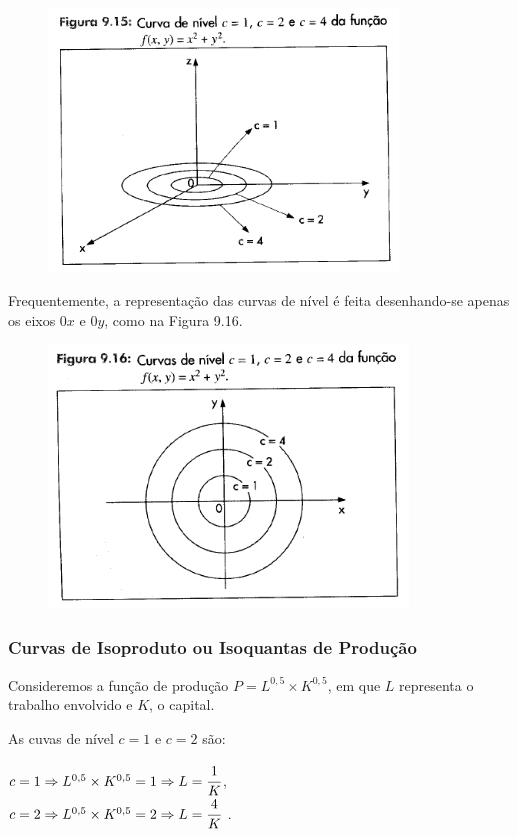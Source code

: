 		\begin{figure}[H]
			\includegraphics[height=7cm]{images/morettin_figura-9-15}
		\end{figure}

		Frequentemente, a representação das curvas de nível é feita desenhando-se apenas os eixos $0x$ e $0y$, como na Figura 9.16.


		\begin{figure}[H]
			\includegraphics[height=7cm]{images/morettin_figura-9-16}
		\end{figure}
		
		\subsubsection{Curvas de Isoproduto ou Isoquantas de Produção \cite{morettin}}

			Consideremos a função de produção $P = L^{0,5} \times K^{0,5}$, em que $L$ representa o trabalho envolvido e $K$, o capital.

			As cuvas de nível $c = 1$ e $c = 2$ são:

			\medskip

			$c = 1 \Rightarrow L^{0,5} \times K^{0,5} = 1 \Rightarrow L = \cfrac{1}{K}$, \\
			$c = 2 \Rightarrow L^{0,5} \times K^{0,5} = 2 \Rightarrow L = \cfrac{4}{K}$ .

